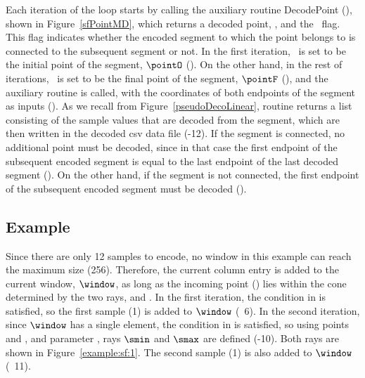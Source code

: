 Each iteration of the loop starts by calling the auxiliary routine DecodePoint (), shown in Figure~\ref{sfPointMD}, which returns a decoded point, \pointP, and the \connected\ flag. This flag indicates whether the encoded segment to which the point belongs to is connected to the subsequent segment or not.  In the first iteration, \pointP\ is set to be the initial point of the segment, $\pointO$ (). On the other hand, in the rest of iterations, \pointP\ is set to be the final point of the segment, $\pointF$ (), and the auxiliary routine \decodeSegment is called, with the coordinates of both endpoints of the segment as inputs (). As we recall from Figure~\ref{pseudoDecoLinear}, routine \decodeSegment returns a list consisting of the sample values that are decoded from the segment, which are then written in the decoded csv data file (-12). If the segment is connected, no additional point must be decoded, since in that case the first endpoint of the subsequent encoded segment is equal to the last endpoint of the last decoded segment (). On the other hand, if the segment is not connected, the first endpoint of the subsequent encoded segment must be decoded ().


\clearpage





\vspace{-5pt}


        


\clearpage
\subsection{Example}
\label{algo:sf:example}


\vspace{-5pt}
\exampleIntro{\ref{example:sf:1}}


Since there are only 12 samples to encode, no window in this example can reach the maximum size (256). Therefore, the current column entry is added to the current window, $\window$, as long as the incoming point (\incoming) lies within the cone determined by the two rays, \smin and \smax. In the first iteration, the condition in  is satisfied, so the first sample (1) is added to $\window$ (\Line~6). In the second iteration, since $\window$ has a single element, the condition in  is satisfied, so using points \snapshot and , and parameter \maxerror, rays $\smin$ and $\smax$ are defined (-10). Both rays are shown in Figure~\ref{example:sf:1}. The second sample (1) is also added to $\window$ (\Line~11). 


